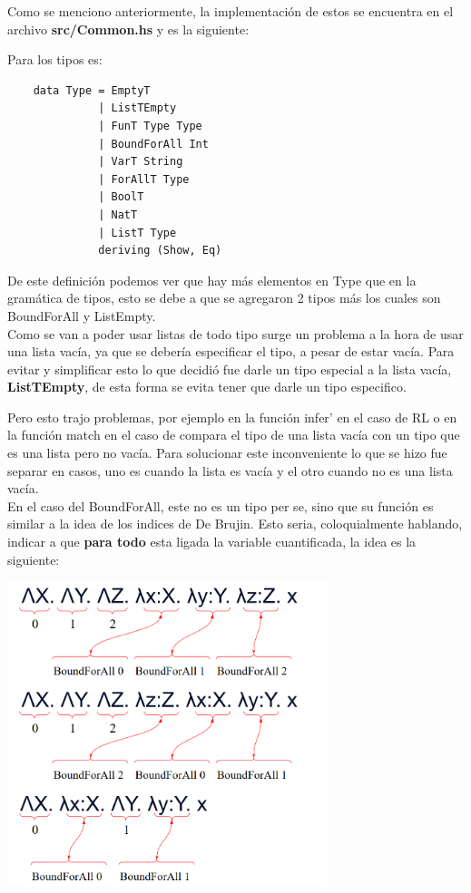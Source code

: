 \documentclass[12pt, titlepage, a4paper]{article}
\begin{document}
Como se menciono anteriormente, la implementación de estos se encuentra en el archivo \textbf{src/Common.hs} y es la siguiente:

\noindent Para los tipos es:
\begin{verbatim}
    data Type = EmptyT 
              | ListTEmpty
              | FunT Type Type
              | BoundForAll Int
              | VarT String
              | ForAllT Type
              | BoolT
              | NatT
              | ListT Type
              deriving (Show, Eq)
\end{verbatim}

De este definición podemos ver que hay más elementos en Type que en la gramática de tipos, esto se debe a que se agregaron 2 tipos más
los cuales son BoundForAll y ListEmpty. \\

Como se van a poder usar listas de todo tipo surge un problema a la hora de usar una lista vacía, ya que se debería especificar el tipo, 
a pesar de estar vacía. 
Para evitar y simplificar esto lo que decidió fue darle un tipo especial a la lista vacía, \textbf{ListTEmpty}, de esta forma se evita 
tener que darle un tipo especifico.

Pero esto trajo problemas, por ejemplo en la función infer' en el caso de RL o en la función match en el caso de compara el tipo de una lista vacía con un tipo que es 
una lista pero no vacía. Para solucionar este inconveniente lo que se hizo fue separar en casos, uno es cuando la lista es 
vacía y el otro cuando no es una lista vacía.\\

En el caso del BoundForAll, este no es un tipo per se, sino que su función es similar a la idea 
de los indices de De Brujin. Esto seria, coloquialmente hablando, indicar a que \textbf{para todo} esta ligada la variable cuantificada, la idea es la siguiente:

\begin{center}
    \includegraphics[width=0.7\textwidth]{Imagenes/EjemploBoundForAll.png}
\end{center}
\end{document}
